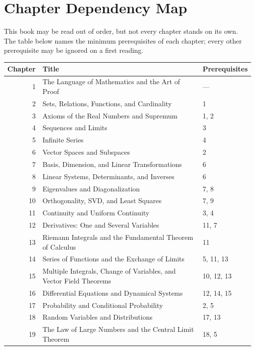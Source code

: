 \chapter*{Chapter Dependency Map}

This book may be read out of order, but not every chapter stands on its own. The table
below names the minimum prerequisites of each chapter; every other prerequisite may be
ignored on a first reading.

\begin{center}
\small
\begin{tabular}{@{}r p{9.0cm} p{2.8cm}@{}}
\toprule
\textbf{Chapter} & \textbf{Title} & \textbf{Prerequisites} \\
\midrule
1 & The Language of Mathematics and the Art of Proof & --- \\
2 & Sets, Relations, Functions, and Cardinality & 1 \\
3 & Axioms of the Real Numbers and Supremum & 1, 2 \\
4 & Sequences and Limits & 3 \\
5 & Infinite Series & 4 \\
6 & Vector Spaces and Subspaces & 2 \\
7 & Basis, Dimension, and Linear Transformations & 6 \\
8 & Linear Systems, Determinants, and Inverses & 6 \\
9 & Eigenvalues and Diagonalization & 7, 8 \\
10 & Orthogonality, SVD, and Least Squares & 7, 9 \\
11 & Continuity and Uniform Continuity & 3, 4 \\
12 & Derivatives: One and Several Variables & 11, 7 \\
13 & Riemann Integrals and the Fundamental Theorem of Calculus & 11 \\
14 & Series of Functions and the Exchange of Limits & 5, 11, 13 \\
15 & Multiple Integrals, Change of Variables, and Vector Field Theorems & 10, 12, 13 \\
16 & Differential Equations and Dynamical Systems & 12, 14, 15 \\
17 & Probability and Conditional Probability & 2, 5 \\
18 & Random Variables and Distributions & 17, 13 \\
19 & The Law of Large Numbers and the Central Limit Theorem & 18, 5 \\

\end{tabular}
\end{center}
